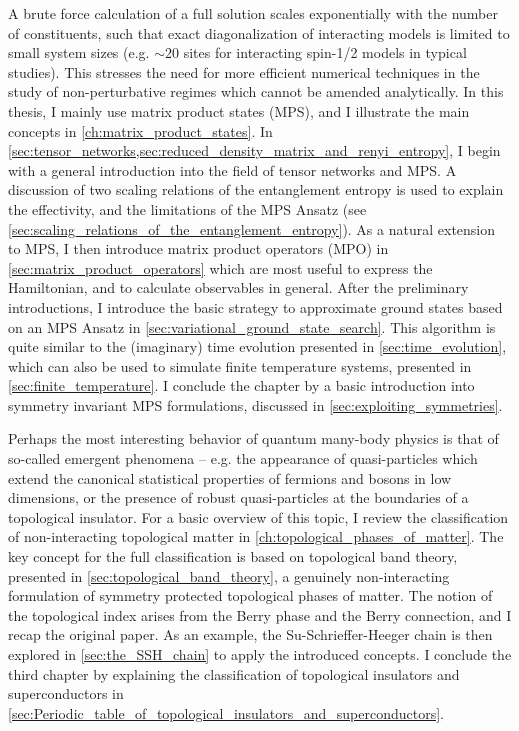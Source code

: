 A brute force calculation of a full solution scales exponentially with the number of constituents, such that exact diagonalization of interacting models is limited to small system sizes (e.g. $\sim 20$ sites for interacting spin-1/2 models in typical studies).
This stresses the need for more efficient numerical techniques in the study of non-perturbative regimes which cannot be amended analytically.
In this thesis, I mainly use matrix product states (MPS), and I illustrate the main concepts in \cref{ch:matrix_product_states}.
In \cref{sec:tensor_networks,sec:reduced_density_matrix_and_renyi_entropy}, I begin with a general introduction into the field of tensor networks and MPS.
A discussion of two scaling relations of the entanglement entropy is used to explain the effectivity, and the limitations of the MPS Ansatz (see \cref{sec:scaling_relations_of_the_entanglement_entropy}).
As a natural extension to MPS, I then introduce matrix product operators (MPO) in \cref{sec:matrix_product_operators} which are most useful to express the Hamiltonian, and to calculate observables in general.
After the preliminary introductions, I introduce the basic strategy to approximate ground states based on an MPS Ansatz in \cref{sec:variational_ground_state_search}.
This algorithm is quite similar to the (imaginary) time evolution presented in \cref{sec:time_evolution}, which can also be used to simulate finite temperature systems, presented in \cref{sec:finite_temperature}.
I conclude the chapter by a basic introduction into symmetry invariant MPS formulations, discussed in \cref{sec:exploiting_symmetries}.

Perhaps the most interesting behavior of quantum many-body physics is that of so-called emergent phenomena -- e.g. the appearance of quasi-particles which extend the canonical statistical properties of fermions and bosons in low dimensions, or the presence of robust quasi-particles at the boundaries of a topological insulator.
For a basic overview of this topic, I review the classification of non-interacting topological matter in \cref{ch:topological_phases_of_matter}.
The key concept for the full classification is based on topological band theory, presented in \cref{sec:topological_band_theory}, a genuinely non-interacting formulation of symmetry protected topological phases of matter.
The notion of the topological index arises from the Berry phase and the Berry connection, and I recap the original paper.
As an example, the Su-Schrieffer-Heeger chain is then explored in \cref{sec:the_SSH_chain} to apply the introduced concepts.
I conclude the third chapter by explaining the classification of topological insulators and superconductors in \cref{sec:Periodic_table_of_topological_insulators_and_superconductors}.


